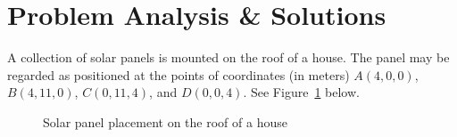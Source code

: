 \documentclass[12pt]{article} %
\numberwithin{equation}{section}
\begin{document}
\pagebreak[4]
\section{Problem Analysis \& Solutions}
    \indent A collection of solar panels is mounted on the roof of a house.
    The panel may be regarded as positioned at the points of coordinates (in meters) \(A(4, 0, 0)\), \(B(4, 11, 0)\), \(C(0, 11, 4)\), and \(D(0, 0, 4)\).
    See Figure~\ref{fig:solar-panels} below.
    \medskip
    \begin{figure}[H]
        \centering
        \caption{Solar panel placement on the roof of a house}
        \label{fig:solar-panels}
    \end{figure}
\pagebreak[3]
\end{document}
